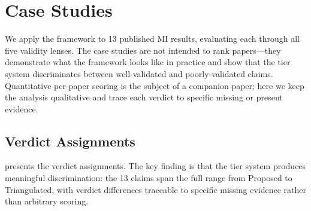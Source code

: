 \documentclass{article}
\begin{document}
\section{Case Studies}
\label{sec:case-studies}

We apply the framework to 13 published MI results, evaluating each through all five validity lenses. The case studies are not intended to rank papers---they demonstrate what the framework looks like in practice and show that the tier system discriminates between well-validated and poorly-validated claims. Quantitative per-paper scoring is the subject of a companion paper; here we keep the analysis qualitative and trace each verdict to specific missing or present evidence.

\subsection{Verdict Assignments}

 presents the verdict assignments. The key finding is that the tier system produces meaningful discrimination: the 13 claims span the full range from Proposed to Triangulated, with verdict differences traceable to specific missing evidence rather than arbitrary scoring.
\end{document}
